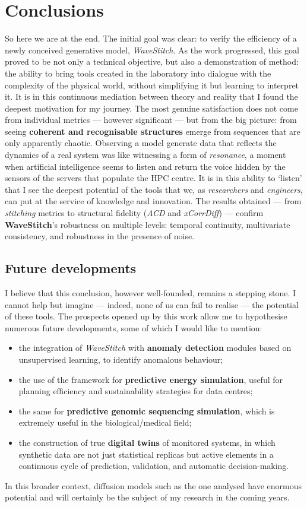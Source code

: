 \chapter{Conclusions}

So here we are at the end. The initial goal was clear: to verify the efficiency of a newly conceived generative model, \emph{WaveStitch}.  
As the work progressed, this goal proved to be not only a technical objective, but also a demonstration of method: the ability to bring tools created in the laboratory into dialogue with the complexity of the physical world, without simplifying it but learning to interpret it.  
It is in this continuous mediation between theory and reality that I found the deepest motivation for my journey.  
The most genuine satisfaction does not come from individual metrics — however significant — but from the big picture: from seeing \textbf{coherent and recognisable structures} emerge from sequences that are only apparently chaotic.  
Observing a model generate data that reflects the dynamics of a real system was like witnessing a form of \emph{resonance}, a moment when artificial intelligence seems to listen and return the voice hidden by the sensors of the servers that populate the HPC centre.  
It is in this ability to ‘listen’ that I see the deepest potential of the tools that we, as \emph{researchers} and \emph{engineers}, can put at the service of knowledge and innovation.  
The results obtained — from \emph{stitching} metrics to structural fidelity (\emph{ACD} and \emph{xCorrDiff}) — confirm \textbf{WaveStitch}'s robustness on multiple levels: temporal continuity, multivariate consistency, and robustness in the presence of noise.  

\section{Future developments}
I believe that this conclusion, however well-founded, remains a stepping stone.  
I cannot help but imagine — indeed, none of us can fail to realise — the potential of these tools.  
The prospects opened up by this work allow me to hypothesise numerous future developments, some of which I would like to mention:
\begin{itemize}
  \item the integration of \emph{WaveStitch} with \textbf{anomaly detection} modules based on unsupervised learning, to identify anomalous behaviour;
  \item the use of the framework for \textbf{predictive energy simulation}, useful for planning efficiency and sustainability strategies for data centres;
  \item the same for \textbf{predictive genomic sequencing simulation}, which is extremely useful in the biological/medical field;
  \item the construction of true \textbf{digital twins} of monitored systems, in which synthetic data are not just statistical replicas but active elements in a continuous cycle of prediction, validation, and automatic decision-making.
\end{itemize}
In this broader context, diffusion models such as the one analysed have enormous potential and will certainly be the subject of my research in the coming years.

